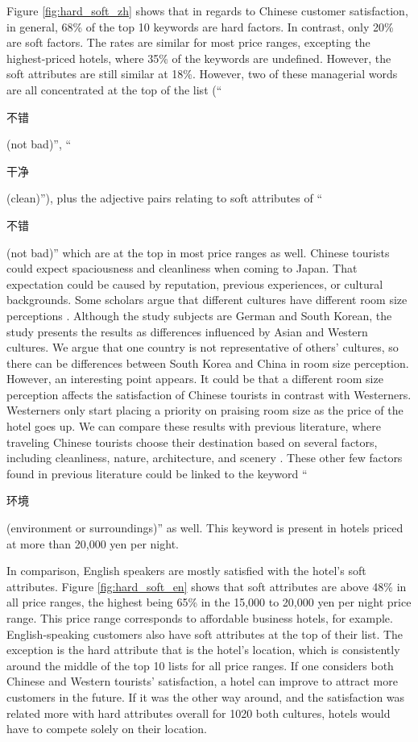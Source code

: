 \documentclass[smallextended,natbib]{svjour3}       %
\begin{document}
    Figure \ref{fig:hard_soft_zh} shows that in regards to Chinese customer satisfaction, in general, 68\% of the top 10 keywords are hard factors. In contrast, only 20\% are soft factors. The rates are similar for most price ranges, excepting the highest-priced hotels, where 35\% of the keywords are undefined. However, the soft attributes are still similar at 18\%. However, two of these managerial words are all concentrated at the top of the list (``\begin{CJK}{UTF8}{gbsn}不错\end{CJK} (not bad)'', ``\begin{CJK}{UTF8}{gbsn}干净\end{CJK} (clean)''), plus the adjective pairs relating to soft attributes of ``\begin{CJK}{UTF8}{gbsn}不错\end{CJK} (not bad)'' which are at the top in most price ranges as well. Chinese tourists could expect spaciousness and cleanliness when coming to Japan. That expectation could be caused by reputation, previous experiences, or cultural backgrounds. Some scholars argue that different cultures have different room size perceptions \cite[][]{Saulton2017}. Although the study subjects are German and South Korean, the study presents the results as differences influenced by Asian and Western cultures. We argue that one country is not representative of others’ cultures, so there can be differences between South Korea and China in room size perception. However, an interesting point appears. It could be that a different room size perception affects the satisfaction of Chinese tourists in contrast with Westerners. Westerners only start placing a priority on praising room size as the price of the hotel goes up. We can compare these results with previous literature, where traveling Chinese tourists choose their destination based on several factors, including cleanliness, nature, architecture, and scenery \cite[][]{ryan2001}. These other few factors found in previous literature could be linked to the keyword ``\begin{CJK}{UTF8}{gbsn}环境\end{CJK} (environment or surroundings)'' as well. This keyword is present in hotels priced at more than 20,000 yen per night. 

    In comparison, English speakers are mostly satisfied with the hotel's soft attributes. Figure \ref{fig:hard_soft_en} shows that soft attributes are above 48\% in all price ranges, the highest being 65\% in the 15,000 to 20,000 yen per night price range. This price range corresponds to affordable business hotels, for example. English-speaking customers also have soft attributes at the top of their list. The exception is the hard attribute that is the hotel's location, which is consistently around the middle of the top 10 lists for all price ranges. If one considers both Chinese and Western tourists’ satisfaction, a hotel can improve to attract more customers in the future. If it was the other way around, and the satisfaction was related more with hard attributes overall for 1020 both cultures, hotels would have to compete solely on their location.
\end{document}
